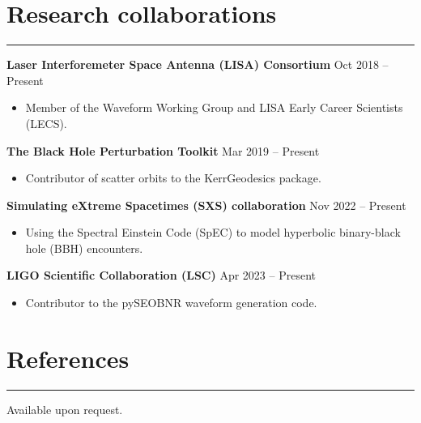 \documentclass[10.5pt, oneside]{article}   	%
\begin{document}

{\color{Sectioncolour}
\section*{Research collaborations}
\vspace{-3mm}
\noindent\rule{\linewidth}{0.6pt}}
{\bf Laser Interforemeter Space Antenna (LISA) Consortium}  \hfill Oct 2018 -- Present \\
\vspace{-5mm}
\begin{itemize}
\item Member of the Waveform Working Group and LISA Early Career Scientists (LECS).
\end{itemize} 
{\bf The Black Hole Perturbation Toolkit}  \hfill Mar 2019 -- Present \\
\vspace{-5mm}
\begin{itemize}
\item Contributor of scatter orbits to the KerrGeodesics package. \href{https://bhptoolkit.org/KerrGeodesics/}{}
\end{itemize}
{\bf Simulating eXtreme Spacetimes (SXS) collaboration}  \hfill Nov 2022 -- Present \\
\vspace{-5mm}
\begin{itemize}
\item Using the Spectral Einstein Code (SpEC) to model hyperbolic binary-black hole (BBH) encounters.
\end{itemize} 
{\bf LIGO Scientific Collaboration (LSC)}  \hfill Apr 2023 -- Present \\
\vspace{-5mm}
\begin{itemize}
\item Contributor to the pySEOBNR waveform generation code.
\end{itemize} 

{\color{Sectioncolour}
\section*{References}
\vspace{-3mm}
\noindent\rule{\linewidth}{0.6pt}}
Available upon request.
\end{document}
